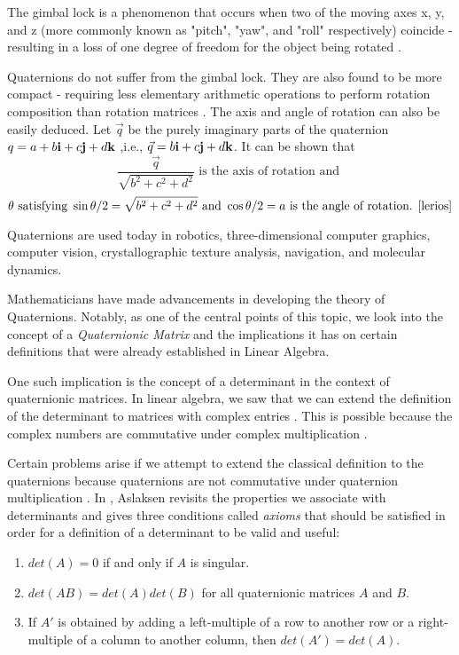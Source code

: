 \noindent The gimbal lock is a phenomenon that occurs when two of the moving axes x, y, and z (more commonly known as "pitch", "yaw", and "roll" respectively) coincide - resulting in a loss of one degree of freedom for the object being rotated \cite{jia}. 


Quaternions do not suffer from the gimbal lock. They are also found to be more compact - requiring less elementary arithmetic operations to perform rotation composition than rotation matrices \cite{lerios}. The axis and angle of rotation can also be easily deduced. Let $\vec{q}$ be the purely imaginary parts of the quaternion $q = a + b\textbf{i} + c\textbf{j} + d\textbf{k} $ ,i.e., $\vec{q} = b\textbf{i} + c\textbf{j} + d\textbf{k}$. It can be shown that $$\frac{\vec{q}}{\sqrt{b^2+c^2+d^2}} \text{ is the axis of rotation and }$$ $$\theta \text{ satisfying } \sin{\theta/2} = \sqrt{b^2+c^2+d^2} \text{ and } \cos{\theta/2} = a \text{ is the angle of rotation. \cite{lerios}}$$

Quaternions are used today in robotics, three-dimensional computer graphics, computer vision, crystallographic texture analysis, navigation, and molecular dynamics. 

Mathematicians have made advancements in developing the theory of Quaternions. Notably, as one of the central points of this topic, we look into the concept of a \emph{Quaternionic Matrix} and the implications it has on certain definitions that were already established in Linear Algebra. 

One such implication is the concept of a determinant in the context of quaternionic matrices. In linear algebra, we saw that we can extend the definition of the determinant to matrices with complex entries \cite{stamaria}. This is possible because the complex numbers are commutative under complex multiplication \cite{aslaksen}. 

Certain problems arise if we attempt to extend the classical definition to the quaternions because quaternions are not commutative under quaternion multiplication \cite{aslaksen}. In \cite{aslaksen}, Aslaksen revisits the properties we associate with determinants and gives three conditions called \emph{axioms} that should be satisfied in order for a definition of a determinant to be valid and useful:
\begin{enumerate}
	\item $det(A) = 0$ if and only if $A$ is singular.
	\item $det(AB) = det(A)det(B)$ for all quaternionic matrices $A$ and $B$.
	\item If $A'$ is obtained by adding a left-multiple of a row to another row or a right-multiple of a column to another column, then $det(A')=det(A)$.
\end{enumerate}

